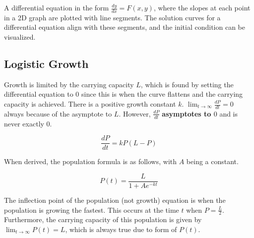 A differential equation in the form $\frac{dy}{dx}=F(x,y)$, where the slopes 
at each point in a 2D graph are plotted with line segments.
The solution curves for a differential equation align with these segments,
and the initial condition can be visualized.

\subsection{Logistic Growth}\label{subsec:logistic-growth}

Growth is limited by the carrying capacity $L$, which is found by setting the differential equation to 0
since this is when the curve flattens and the carrying capacity is achieved.
There is a positive growth constant $k$. $\lim_{t\to{\infty}}\frac{dP}{dt}=0$ always because 
of the asymptote to $L$.
However, $\frac{dP}{dt}$ \textbf{asymptotes to $0$} and is never exactly 0.

\[\frac{dP}{dt}=kP(L-P)\]

When derived, the population formula is as follows, with $A$ being a constant.

\[P(t)=\frac{L}{1+Ae^{-kt}}\]

The inflection point of the population (not growth) equation is when the population is growing the fastest.
This occurs at the time $t$ when $P=\frac{L}{2}$.
Furthermore, the carrying capacity of this population is given by
$\lim_{t\to{\infty}}P(t)=L$, which is always true due to form of $P(t)$.
